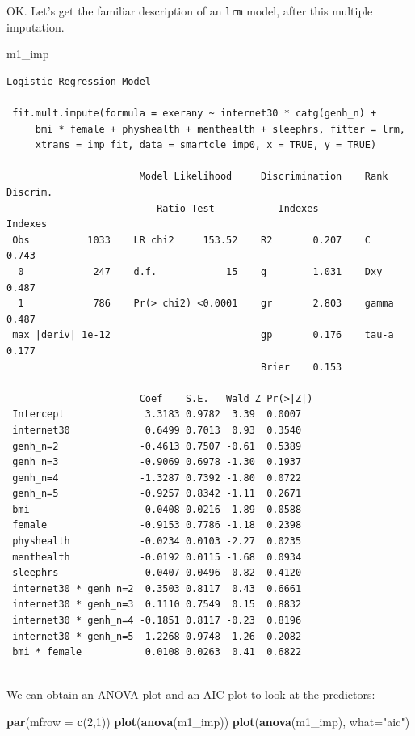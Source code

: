 \documentclass[]{book}
\newenvironment{Shaded}{\begin{snugshade}}{\end{snugshade}}
\newcommand{\KeywordTok}[1]{\textcolor[rgb]{0.13,0.29,0.53}{\textbf{#1}}}
\newcommand{\DataTypeTok}[1]{\textcolor[rgb]{0.13,0.29,0.53}{#1}}
\newcommand{\DecValTok}[1]{\textcolor[rgb]{0.00,0.00,0.81}{#1}}
\newcommand{\StringTok}[1]{\textcolor[rgb]{0.31,0.60,0.02}{#1}}
\newcommand{\NormalTok}[1]{#1}
\theoremstyle{definition}
\theoremstyle{definition}
\theoremstyle{definition}
\theoremstyle{remark}
\begin{document}
OK. Let's get the familiar description of an \texttt{lrm} model, after
this multiple imputation.

\begin{Shaded}
\begin{Highlighting}[]
\NormalTok{m1_imp}
\end{Highlighting}
\end{Shaded}

\begin{verbatim}
Logistic Regression Model
 
 fit.mult.impute(formula = exerany ~ internet30 * catg(genh_n) + 
     bmi * female + physhealth + menthealth + sleephrs, fitter = lrm, 
     xtrans = imp_fit, data = smartcle_imp0, x = TRUE, y = TRUE)
 
                       Model Likelihood     Discrimination    Rank Discrim.    
                          Ratio Test           Indexes           Indexes       
 Obs          1033    LR chi2     153.52    R2       0.207    C       0.743    
  0            247    d.f.            15    g        1.031    Dxy     0.487    
  1            786    Pr(> chi2) <0.0001    gr       2.803    gamma   0.487    
 max |deriv| 1e-12                          gp       0.176    tau-a   0.177    
                                            Brier    0.153                     
 
                       Coef    S.E.   Wald Z Pr(>|Z|)
 Intercept              3.3183 0.9782  3.39  0.0007  
 internet30             0.6499 0.7013  0.93  0.3540  
 genh_n=2              -0.4613 0.7507 -0.61  0.5389  
 genh_n=3              -0.9069 0.6978 -1.30  0.1937  
 genh_n=4              -1.3287 0.7392 -1.80  0.0722  
 genh_n=5              -0.9257 0.8342 -1.11  0.2671  
 bmi                   -0.0408 0.0216 -1.89  0.0588  
 female                -0.9153 0.7786 -1.18  0.2398  
 physhealth            -0.0234 0.0103 -2.27  0.0235  
 menthealth            -0.0192 0.0115 -1.68  0.0934  
 sleephrs              -0.0407 0.0496 -0.82  0.4120  
 internet30 * genh_n=2  0.3503 0.8117  0.43  0.6661  
 internet30 * genh_n=3  0.1110 0.7549  0.15  0.8832  
 internet30 * genh_n=4 -0.1851 0.8117 -0.23  0.8196  
 internet30 * genh_n=5 -1.2268 0.9748 -1.26  0.2082  
 bmi * female           0.0108 0.0263  0.41  0.6822  
 
\end{verbatim}

We can obtain an ANOVA plot and an AIC plot to look at the predictors:

\begin{Shaded}
\begin{Highlighting}[]
\KeywordTok{par}\NormalTok{(}\DataTypeTok{mfrow =} \KeywordTok{c}\NormalTok{(}\DecValTok{2}\NormalTok{,}\DecValTok{1}\NormalTok{))}
\KeywordTok{plot}\NormalTok{(}\KeywordTok{anova}\NormalTok{(m1_imp))}
\KeywordTok{plot}\NormalTok{(}\KeywordTok{anova}\NormalTok{(m1_imp), }\DataTypeTok{what=}\StringTok{"aic"}\NormalTok{)}
\end{Highlighting}
\end{Shaded}
\end{document}
